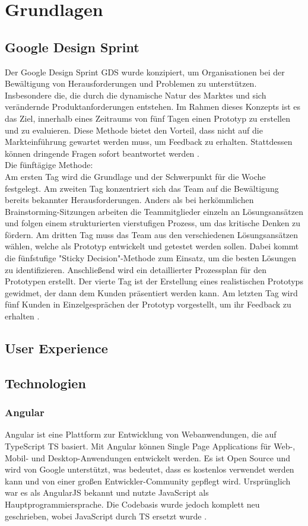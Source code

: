\chapter{Grundlagen}

\section{Google Design Sprint}
Der Google Design Sprint \ac{GDS} wurde konzipiert, um Organisationen bei der Bewältigung von Herausforderungen und Problemen zu unterstützen. 
Insbesondere die, die durch die dynamische Natur des Marktes und sich verändernde Produktanforderungen entstehen. 
Im Rahmen dieses Konzepts ist es das Ziel, innerhalb eines Zeitraums von fünf Tagen einen Prototyp zu erstellen und zu evaluieren. 
Diese Methode bietet den Vorteil, dass nicht auf die Markteinführung gewartet werden muss, um Feedback zu erhalten. Stattdessen können dringende Fragen sofort beantwortet werden \cite[S.98 f.]{Design_Sprint}.\\
Die fünftägige Methode:\\
Am ersten Tag wird die Grundlage und der Schwerpunkt für die Woche festgelegt. 
Am zweiten Tag konzentriert sich das Team auf die Bewältigung bereits bekannter Herausforderungen. Anders als bei herkömmlichen Brainstorming-Sitzungen arbeiten die Teammitglieder einzeln an Lösungsansätzen und folgen einem strukturierten vierstufigen Prozess, um das kritische Denken zu fördern.
Am dritten Tag muss das Team aus den verschiedenen Lösungsansätzen wählen, welche als Prototyp entwickelt und getestet werden sollen. Dabei kommt die fünfstufige "Sticky Decision"-Methode zum Einsatz, um die besten Lösungen zu identifizieren. Anschließend wird ein detaillierter Prozessplan für den Prototypen erstellt. 
Der vierte Tag ist der Erstellung eines realistischen Prototyps gewidmet, der dann dem Kunden präsentiert werden kann. 
Am letzten Tag wird fünf Kunden in Einzelgesprächen der Prototyp vorgestellt, um ihr Feedback zu erhalten \cite[S.99]{Design_Sprint}.

\section{User Experience}


\section{Technologien}
\subsection{Angular}
Angular ist eine Plattform zur Entwicklung von Webanwendungen, die auf TypeScript \ac{TS} basiert. 
Mit Angular können Single Page Applications für Web-, Mobil- und Desktop-Anwendungen entwickelt werden. 
Es ist Open Source und wird von Google unterstützt, was bedeutet, dass es kostenlos verwendet werden kann und von einer großen Entwickler-Community gepflegt wird. 
Ursprünglich war es als AngularJS bekannt und nutzte JavaScript als Hauptprogrammiersprache. Die Codebasis wurde jedoch komplett neu geschrieben, wobei JavaScript durch TS ersetzt wurde \cite{angular_arch}.\\

